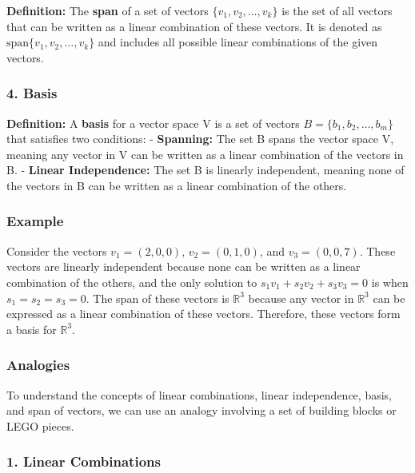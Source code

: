 \documentclass[11pt]{article}
\begin{document}
\textbf{Definition:} The \textbf{span} of a set of vectors
\(\{v_1, v_2, \ldots, v_k\}\) is the set of all vectors that can be
written as a linear combination of these vectors. It is denoted as
\(\text{span}\{v_1, v_2, \ldots, v_k\}\) and includes all possible
linear combinations of the given vectors.

\hypertarget{basis}{%
\subsubsection{4. Basis}\label{basis}}

\textbf{Definition:} A \textbf{basis} for a vector space V is a set of
vectors \(B = \{b_1, b_2, \ldots, b_m\}\) that satisfies two conditions:
- \textbf{Spanning:} The set B spans the vector space V, meaning any
vector in V can be written as a linear combination of the vectors in B.
- \textbf{Linear Independence:} The set B is linearly independent,
meaning none of the vectors in B can be written as a linear combination
of the others.

\hypertarget{example}{%
\subsubsection{Example}\label{example}}

Consider the vectors \(v_1 = (2, 0, 0)\), \(v_2 = (0, 1, 0)\), and
\(v_3 = (0, 0, 7)\). These vectors are linearly independent because none
can be written as a linear combination of the others, and the only
solution to \(s_1 v_1 + s_2 v_2 + s_3 v_3 = 0\) is when
\(s_1 = s_2 = s_3 = 0\). The span of these vectors is \(\mathbb{R}^3\)
because any vector in \(\mathbb{R}^3\) can be expressed as a linear
combination of these vectors. Therefore, these vectors form a basis for
\(\mathbb{R}^3\).

    \hypertarget{analogies}{%
\subsubsection{\texorpdfstring{\textbf{Analogies}}{Analogies}}\label{analogies}}

To understand the concepts of linear combinations, linear independence,
basis, and span of vectors, we can use an analogy involving a set of
building blocks or LEGO pieces.

\hypertarget{linear-combinations}{%
\subsubsection{\texorpdfstring{1. \textbf{Linear
Combinations}}{1. Linear Combinations}}\label{linear-combinations}}
\end{document}
